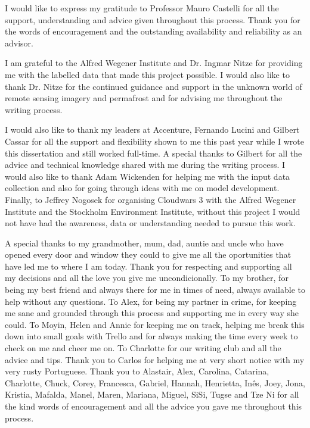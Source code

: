 

\begin{ntacknowledgements}

I would like to express my gratitude to Professor Mauro Castelli for all the support, understanding and advice given throughout this process. Thank you for the words of encouragement and the outstanding availability and reliability as an advisor.

I am grateful to the Alfred Wegener Institute and Dr. Ingmar Nitze for providing me with the labelled data that made this project possible. I would also like to thank Dr. Nitze for the continued guidance and support in the unknown world of remote sensing imagery and permafrost and for advising me throughout the writing process.

I would also like to thank my leaders at Accenture, Fernando Lucini and Gilbert Cassar for all the support and flexibility shown to me this past year while I wrote this dissertation and still worked full-time. A special thanks to Gilbert for all the advice and technical knowledge shared with me during the writing process. I would also like to thank Adam Wickenden for helping me with the input data collection and also for going through ideas with me on model development. Finally, to Jeffrey Nogosek for organising Cloudwars 3 with the Alfred Wegener Institute and the Stockholm Environment Institute, without this project I would not have had the awareness, data or understanding needed to pursue this work.

A special thanks to my grandmother, mum, dad, auntie and uncle who have opened every door and window they could to give me all the oportunities that have led me to where I am today. Thank you for respecting and supporting all my decisions and all the love you give me uncondicionally. To my brother, for being my best friend and always there for me in times of need, always available to help without any questions. To Alex, for being my partner in crime, for keeping me sane and grounded through this process and supporting me in every way she could. To Moyin, Helen and Annie for keeping me on track, helping me break this down into small goals with Trello and for always making the time every week to check on me and cheer me on. To Charlotte for our writing club and all the advice and tips. Thank you to Carlos for helping me at very short notice with my very rusty Portuguese. Thank you to Alastair, Alex, Carolina, Catarina, Charlotte, Chuck, Corey, Francesca, Gabriel, Hannah, Henrietta, Inês, Joey, Jona, Kristia, Mafalda, Manel, Maren, Mariana, Miguel, SiSi, Tugse and Tze Ni for all the kind words of encouragement and all the advice you gave me throughout this process.


\end{ntacknowledgements}
